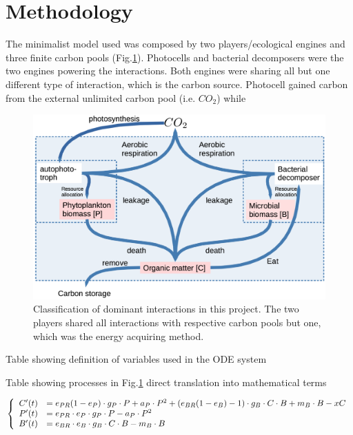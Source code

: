 \documentclass[../thesis.tex]{subfiles} %
\begin{document}
\section{Methodology}

The minimalist model used was composed by two players/ecological engines and three finite carbon pools (Fig.\ref{modelInWord}).  Photocells and bacterial decomposers were the two engines powering the interactions.  Both engines were sharing all but one different type of interaction, which is the carbon source.  Photocell gained carbon from the external unlimited carbon pool (i.e. $CO_2$) while 

\begin{figure}[H]
    \centering
    \includegraphics[width=.8\linewidth]{thesisSec/model.png}
    \caption[Model visualization]{Classification of dominant interactions in this project.  The two players shared all interactions with respective carbon pools but one, which was the energy acquiring method.}
    \label{modelInWord}
\end{figure}

\begin{table}[H]
    \centering
    \caption[Algebra variables definitions]{Table showing definition of variables used in the ODE system}
    \label{varInTab}
\end{table}

\begin{table}[H]
    \centering
    \caption[Processes in algebra terms]{Table showing processes in Fig.\ref{modelInWord} direct translation into mathematical terms}
    \label{termInTab}
\end{table}

\begin{equation*}\left\{\begin{array}{rl}
    C'(t) &= e_{PR}(1-e_P)\cdot g_P\cdot P +a_P\cdot P^2 +(e_{BR}(1-e_B)-1)\cdot g_B\cdot C\cdot B +m_B\cdot B -xC\\
    P'(t) &= e_{PR}\cdot e_P\cdot g_P\cdot P -a_P\cdot P^2\\
    B'(t) &= e_{BR}\cdot e_B\cdot g_B\cdot C\cdot B -m_B\cdot B
\end{array}\right.\end{equation*}
\end{document}
